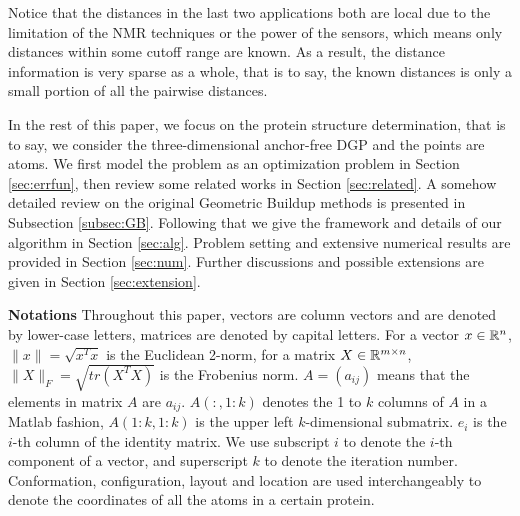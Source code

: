 \documentclass[a4paper,12pt]{article}
\begin{document}
Notice that the distances in the last two applications both are local due to the limitation of the NMR techniques or the power of the sensors, which means only distances within some cutoff range are known. As a result, the distance information is very sparse as a whole, that is to say, the known distances is only a small portion of all the pairwise distances.

In the rest of this paper, we focus on the protein structure determination, that is to say, we consider the three-dimensional anchor-free DGP and the points are atoms. We first model the problem as an optimization problem in Section \ref{sec:errfun}, then review some related works in Section \ref{sec:related}. A somehow detailed review on the original Geometric Buildup methods is presented in Subsection \ref{subsec:GB}. Following that we give the framework and details of our algorithm in Section \ref{sec:alg}. Problem setting and extensive numerical results are provided in Section \ref{sec:num}. Further discussions and possible extensions are given in Section \ref{sec:extension}.

\textbf{Notations} Throughout this paper, vectors are column vectors and are denoted by lower-case letters, matrices are denoted by capital letters. For a vector $x\in \mathbb{R}^n$, $\|x\|=\sqrt{x^Tx}$ is the Euclidean 2-norm, for a matrix $X\in \mathbb{R}^{m\times n}$, $\|X\|_F=\sqrt{tr(X^TX)}$ is the Frobenius norm. $A=(a_{ij})$ means that the elements in matrix $A$ are $a_{ij}$. $A(:,1:k)$ denotes the 1 to $k$ columns of $A$ in a Matlab fashion, $A(1:k,1:k)$ is the upper left $k$-dimensional submatrix. $e_i$ is the $i$-th column of the identity matrix. We use subscript $i$ to denote the $i$-th component of a vector, and superscript $k$ to denote the iteration number. Conformation, configuration, layout and location are used interchangeably to denote the coordinates of all the atoms in a certain protein.
\end{document}
